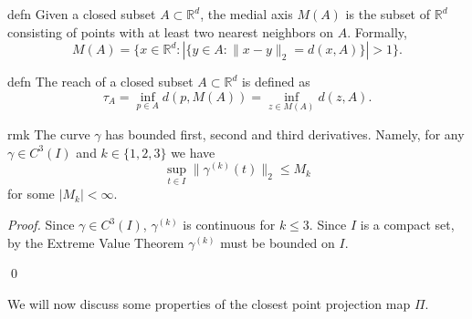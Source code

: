 \documentclass[11pt]{article}
\begin{document}
\begin{restatable}{defn}{}
    Given a closed subset $A \subset \mathbb{R}^d$, the medial axis $M(A)$ is the subset of $\mathbb{R}^d$ consisting of points with at least two nearest neighbors on $A$. Formally,
    \begin{equation}
    M(A) = \{x \in \mathbb{R}^d : |\{y \in A : \|x-y\|_2 = d(x,A)\}| > 1\}. \label{eq: medial axis definition}
    \end{equation}
\end{restatable}

\begin{restatable}{defn}{}
    The reach of a closed subset $A \subset \mathbb{R}^d$ is defined as 
    \begin{equation}
        \tau_A = \inf_{p\in A} d(p,M(A)) = \inf_{z\in M(A)}d(z,A). \label{eq: reach definition}
    \end{equation}
\end{restatable}


\begin{restatable}{rmk}{} \label{remark: deriv bound}
    The curve $\gamma$ has bounded first, second and third derivatives. Namely, for any $\gamma \in C^3(I)$ and $k \in \{1,2,3\}$ we have 
    \[\sup_{t\in I}\|\gamma^{(k)}(t)\|_2 \leq M_k\]
    for some $|M_k| < \infty$.
\end{restatable}
\noindent \textit{Proof.} Since $\gamma \in C^3(I)$, $\gamma^{(k)}$ is continuous for $k \leq 3$. Since $I$ is a compact set, by the Extreme Value Theorem $\gamma^{(k)}$ must be bounded on $I$. 

\qed{}


\noindent We will now discuss some properties of the closest point projection map $\Pi$. 
\end{document}
